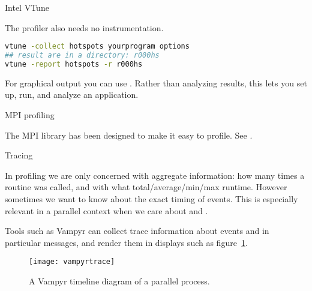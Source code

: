  {Intel VTune}


The  profiler also needs no instrumentation.
\begin{lstlisting}[language=bash]
vtune -collect hotspots yourprogram options
## result are in a directory: r000hs
vtune -report hotspots -r r000hs
\end{lstlisting}
For graphical output you can use .
Rather than analyzing results, this lets you set up, run,
and analyze an application.


 {MPI profiling}

The MPI library has been designed to make it easy to profile.
See .

 {Tracing}

In profiling we are only concerned with aggregate information: how
many times a routine was called, and with what total/average/min/max
runtime. However sometimes we want to know about the exact timing of
events. This is especially relevant in a parallel context when we care
about  and .

Tools such as Vampyr can collect trace information about
events and in particular messages, and render them in displays such as
figure~\ref{fig:vampyr}.
\begin{figure}[ht]
  \texttt{[image: vampyrtrace]}
  \caption{A Vampyr timeline diagram of a parallel process.}
  \label{fig:vampyr}
\end{figure}


